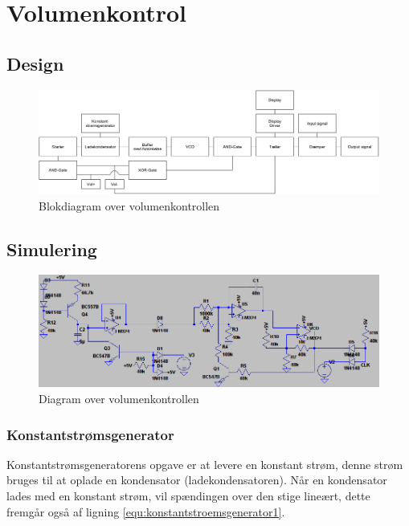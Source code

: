 \chapter{Volumenkontrol}
\label{volumenkontrol}

\section{Design}
\label{volumenkontrol-design}

\begin{figure}[h]
\centering
\includegraphics[width=\textwidth]{teknisk/volumenkontrol/blokdiagram.png}
\caption{Blokdiagram over volumenkontrollen}
\label{fig:volumenkontrol_opbygning}
\end{figure}

\section{Simulering}
\label{volumenkontrol-simulering}

\begin{figure}[h]
\centering
\includegraphics[width=\textwidth]{teknisk/volumenkontrol/diagram.png}
\caption{Diagram over volumenkontrollen}
\label{fig:volumenkontrol_diagram}
\end{figure}

\subsection{Konstantstrømsgenerator}
\label{volumenkontrol-simulering-konstantstroemsgenerator}

Konstantstrømsgeneratorens opgave er at levere en konstant strøm, denne strøm bruges til at oplade en kondensator (ladekondensatoren). Når en kondensator lades med en konstant strøm, vil spændingen over den stige lineært, dette fremgår også af ligning \ref{equ:konstantstroemsgenerator1}.


